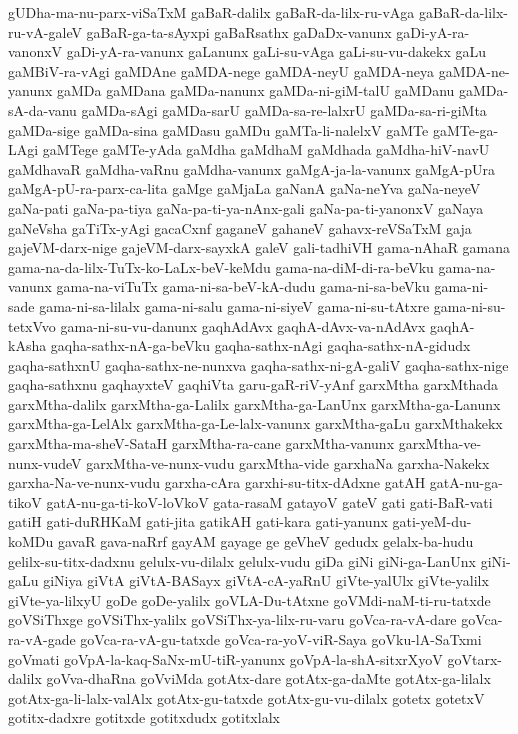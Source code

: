 {gUDha-ma-nu-parx-viSaTxM
gaBaR-dalilx
gaBaR-da-lilx-ru-vAga
gaBaR-da-lilx-ru-vA-galeV
gaBaR-ga-ta-sAyxpi
gaBaRsathx
gaDaDx-vanunx
gaDi-yA-ra-vanonxV
gaDi-yA-ra-vanunx
gaLanunx
gaLi-su-vAga
gaLi-su-vu-dakekx
gaLu
gaMBiV-ra-vAgi
gaMDAne
gaMDA-nege
gaMDA-neyU
gaMDA-neya
gaMDA-ne-yanunx
gaMDa
gaMDana
gaMDa-nanunx
gaMDa-ni-giM-talU
gaMDanu
gaMDa-sA-da-vanu
gaMDa-sAgi
gaMDa-sarU
gaMDa-sa-re-lalxrU
gaMDa-sa-ri-giMta
gaMDa-sige
gaMDa-sina
gaMDasu
gaMDu
gaMTa-li-nalelxV
gaMTe
gaMTe-ga-LAgi
gaMTege
gaMTe-yAda
gaMdha
gaMdhaM
gaMdhada
gaMdha-hiV-navU
gaMdhavaR
gaMdha-vaRnu
gaMdha-vanunx
gaMgA-ja-la-vanunx
gaMgA-pUra
gaMgA-pU-ra-parx-ca-lita
gaMge
gaMjaLa
gaNanA
gaNa-neYva
gaNa-neyeV
gaNa-pati
gaNa-pa-tiya
gaNa-pa-ti-ya-nAnx-gali
gaNa-pa-ti-yanonxV
gaNaya
gaNeVsha
gaTiTx-yAgi
gacaCxnf
gaganeV
gahaneV
gahavx-reVSaTxM
gaja
gajeVM-darx-nige
gajeVM-darx-sayxkA
galeV
gali-tadhiVH
gama-nAhaR
gamana
gama-na-da-lilx-TuTx-ko-LaLx-beV-keMdu
gama-na-diM-di-ra-beVku
gama-na-vanunx
gama-na-viTuTx
gama-ni-sa-beV-kA-dudu
gama-ni-sa-beVku
gama-ni-sade
gama-ni-sa-lilalx
gama-ni-salu
gama-ni-siyeV
gama-ni-su-tAtxre
gama-ni-su-tetxVvo
gama-ni-su-vu-danunx
gaqhAdAvx
gaqhA-dAvx-va-nAdAvx
gaqhA-kAsha
gaqha-sathx-nA-ga-beVku
gaqha-sathx-nAgi
gaqha-sathx-nA-gidudx
gaqha-sathxnU
gaqha-sathx-ne-nunxva
gaqha-sathx-ni-gA-galiV
gaqha-sathx-nige
gaqha-sathxnu
gaqhayxteV
gaqhiVta
garu-gaR-riV-yAnf
garxMtha
garxMthada
garxMtha-dalilx
garxMtha-ga-Lalilx
garxMtha-ga-LanUnx
garxMtha-ga-Lanunx
garxMtha-ga-LelAlx
garxMtha-ga-Le-lalx-vanunx
garxMtha-gaLu
garxMthakekx
garxMtha-ma-sheV-SataH
garxMtha-ra-cane
garxMtha-vanunx
garxMtha-ve-nunx-vudeV
garxMtha-ve-nunx-vudu
garxMtha-vide
garxhaNa
garxha-Nakekx
garxha-Na-ve-nunx-vudu
garxha-cAra
garxhi-su-titx-dAdxne
gatAH
gatA-nu-ga-tikoV
gatA-nu-ga-ti-koV-loVkoV
gata-rasaM
gatayoV
gateV
gati
gati-BaR-vati
gatiH
gati-duRHKaM
gati-jita
gatikAH
gati-kara
gati-yanunx
gati-yeM-du-koMDu
gavaR
gava-naRrf
gayAM
gayage
ge
geVheV
gedudx
gelalx-ba-hudu
gelilx-su-titx-dadxnu
gelulx-vu-dilalx
gelulx-vudu
giDa
giNi
giNi-ga-LanUnx
giNi-gaLu
giNiya
giVtA
giVtA-BASayx
giVtA-cA-yaRnU
giVte-yalUlx
giVte-yalilx
giVte-ya-lilxyU
goDe
goDe-yalilx
goVLA-Du-tAtxne
goVMdi-naM-ti-ru-tatxde
goVSiThxge
goVSiThx-yalilx
goVSiThx-ya-lilx-ru-varu
goVca-ra-vA-dare
goVca-ra-vA-gade
goVca-ra-vA-gu-tatxde
goVca-ra-yoV-viR-Saya
goVku-lA-SaTxmi
goVmati
goVpA-la-kaq-SaNx-mU-tiR-yanunx
goVpA-la-shA-sitxrXyoV
goVtarx-dalilx
goVva-dhaRna
goVviMda
gotAtx-dare
gotAtx-ga-daMte
gotAtx-ga-lilalx
gotAtx-ga-li-lalx-valAlx
gotAtx-gu-tatxde
gotAtx-gu-vu-dilalx
gotetx
gotetxV
gotitx-dadxre
gotitxde
gotitxdudx
gotitxlalx
}
